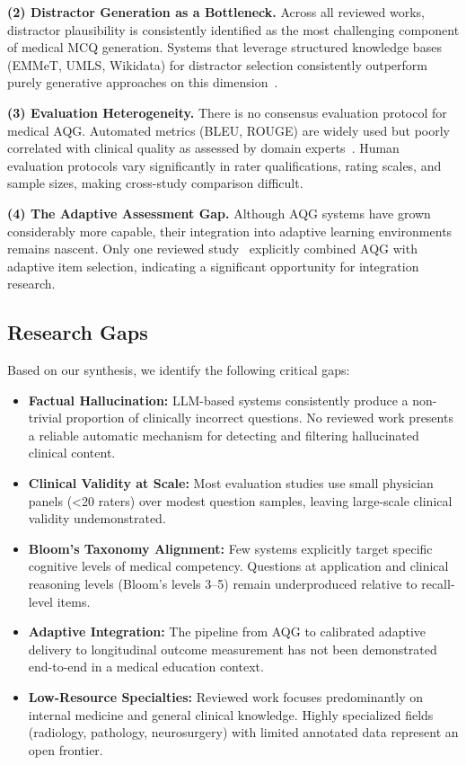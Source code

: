 \documentclass[conference]{IEEEtran}
\begin{document}
\textbf{(2) Distractor Generation as a Bottleneck.} Across all reviewed works, distractor plausibility is consistently identified as the most challenging component of medical MCQ generation. Systems that leverage structured knowledge bases (EMMeT, UMLS, Wikidata) for distractor selection consistently outperform purely generative approaches on this dimension~\cite{leo2019ontology,vachev2022leaf}.

\textbf{(3) Evaluation Heterogeneity.} There is no consensus evaluation protocol for medical AQG. Automated metrics (BLEU, ROUGE) are widely used but poorly correlated with clinical quality as assessed by domain experts~\cite{kurdi2020systematic}. Human evaluation protocols vary significantly in rater qualifications, rating scales, and sample sizes, making cross-study comparison difficult.

\textbf{(4) The Adaptive Assessment Gap.} Although AQG systems have grown considerably more capable, their integration into adaptive learning environments remains nascent. Only one reviewed study~\cite{bulut2023adaptive} explicitly combined AQG with adaptive item selection, indicating a significant opportunity for integration research.

\subsection{Research Gaps}

Based on our synthesis, we identify the following critical gaps:

\begin{itemize}
    \item \textbf{Factual Hallucination:} LLM-based systems consistently produce a non-trivial proportion of clinically incorrect questions. No reviewed work presents a reliable automatic mechanism for detecting and filtering hallucinated clinical content.
    \item \textbf{Clinical Validity at Scale:} Most evaluation studies use small physician panels (<20 raters) over modest question samples, leaving large-scale clinical validity undemonstrated.
    \item \textbf{Bloom's Taxonomy Alignment:} Few systems explicitly target specific cognitive levels of medical competency. Questions at application and clinical reasoning levels (Bloom's levels 3–5) remain underproduced relative to recall-level items.
    \item \textbf{Adaptive Integration:} The pipeline from AQG to calibrated adaptive delivery to longitudinal outcome measurement has not been demonstrated end-to-end in a medical education context.
    \item \textbf{Low-Resource Specialties:} Reviewed work focuses predominantly on internal medicine and general clinical knowledge. Highly specialized fields (radiology, pathology, neurosurgery) with limited annotated data represent an open frontier.
\end{itemize}
\end{document}
